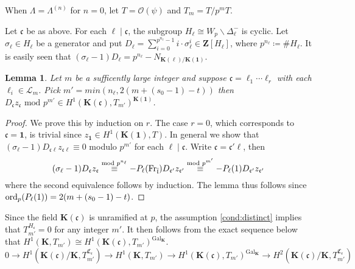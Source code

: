 \documentclass[leqno]{amsart}
\newcommand{\flw}{\bar{\fl}}
\newcommand{\Fr}{\textnormal{Fr}} %
\DeclareMathOperator{\Gal}{Gal}
\newcommand{\ord}{\textnormal{ord}}
\newcommand{\id}{\mathbf{1}}
\newcommand{\Z}{{\mathbf{Z}}}
\newcommand{\K}{{\mathbf{K}}} %
\newcommand{\oo}{\mathcal{O}} %
\newcommand{\rp}[1]{\mathfrak{C}_{#1}} %
\newcommand{\rs}[1]{H_{#1}} %
\newcommand{\rk}[1]{\K({#1})} %
\newcommand{\fc}{\mathfrak{c}}
\newcommand{\fl}{\mathfrak{l}}
\newtheorem{lem}[thm]{Lemma}
\theoremstyle{definition}
\theoremstyle{remark}
\begin{document}
When $\Lambda=\Lambda^{(n)}$ for $n=0$,
let  $T=\oo(\psi)$ and  $T_m=T/p^mT$.

Let $\fc$ be as above.
For each $\ell\mid\fc$,
the subgroup  $\rs{\ell}\cong W_p\backslash \Delta_\ell^-$
is cyclic.
Let  $\sigma_\ell\in \rs{\ell}$ be a generator
and put 
$D_\ell=\sum_{i=0}^{p^{n_\ell}-1}i\cdot \sigma_\ell^i
\in \Z[\rs{\ell}]$,
where $p^{n_\ell}\coloneqq \#\rs{\ell}$.
It is easily seen that 
$(\sigma_\ell-1)D_\ell=p^{n_\ell}-N_{\rk{\ell}/\rk{\id}}$.

\begin{lem}
Let $m$ be a sufficently large integer and
suppose $\fc=\ell_1\cdots\ell_r$
with each $\ell_i\in\mathcal{L}_m$.
Pick $m'=min(n_\ell, 2(m+(s_0-1)-t))$ then
$D_{\fc}z_{\fc}\text{ mod }p^{m'}\in 
H^1(\rk{\fc},T_{m'})^{\rk{\id}}$.
\end{lem}
\begin{proof}
We prove this by induction on $r$.
The case $r=0$, which corresponds to 
$\fc=\id$, is trivial
since $z_{\id}\in H^1(\rk{\id},T)$.
In general
we show that 
$(\sigma_\ell-1)D_{\fc\ell}z_{\fc\ell}\equiv 0$
modulo  $p^{m'}$ for each $\ell\mid \fc$.
Write $\fc=\fc'\ell$, then
\[
	 (\sigma_\ell-1)D_{\fc}z_{\fc}
	 \overset{\text{mod } p^{n_\ell}}{\equiv}
	 -P_\ell(\Fr_{\flw})D_{\fc'}z_{\fc'}
	 \overset{\text{mod } p^{m'}}{\equiv}
	 -P_\ell(1)D_{\fc'}z_{\fc'}
\]
where the second equivalence follows by induction.
The lemma thus follows
since $\ord_p(P_\ell(1))=2(m+(s_0-1)-t)$.
\end{proof}
Since the field $\rk{\fc}$
is unramified at  $p$,
the assumption \eqref{cond:distinct}
implies that $T_{m'}^{\rs{\fc}}=0$
for any integer $m'$. 
It then follows from the exact sequence below
that $H^1(\K, T_{m'})\cong 
H^1(\rk{\fc}, T_{m'})^{\Gal_\K}$.
\[
	0\to H^1(\rk{\fc}/\K, T_{m'}^{\rp{\fc}})\to
	H^1(\K, T_{m'})\to
	H^1(\rk{\fc}, T_{m'})^{\Gal_\K}\to
	H^2(\rk{\fc}/\K, T_{m'}^{\rp{\fc}})
\]
\end{document}
